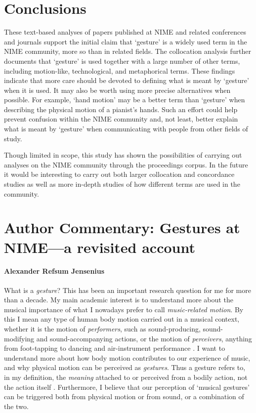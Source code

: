 \section{Conclusions}

These text-based analyses of papers published at NIME and related conferences and journals support the initial claim that `gesture' is a widely used term in the NIME community, more so than in related fields. The collocation analysis further documents that `gesture' is used together with a large number of other terms, including motion-like, technological, and metaphorical terms. 
These findings indicate that more care should be devoted to defining what is meant by `gesture' when it is used. It may also be worth using more precise alternatives when possible. For example, `hand motion' may be a better term than `gesture' when describing the physical motion of a pianist's hands. 
Such an effort could help prevent confusion within the NIME community and, not least, better explain what is meant by `gesture' when communicating with people from other fields of study. 

Though limited in scope, this study has shown the possibilities of carrying out analyses on the NIME community through the proceedings corpus. In the future it would be interesting to carry out both larger collocation and concordance studies as well as more in-depth studies of how different terms are used in the community.


\section*{Author Commentary: Gestures at NIME---a revisited account}


\paragraph{Alexander Refsum Jensenius}


What is a \emph{gesture}? This has been an important research question for me for more than a decade. My main academic interest is to understand more about the musical importance of what I nowadays prefer to call \emph{music-related motion}. By this I mean any type of human body motion carried out in a musical context, whether it is the motion of \emph{performers}, such as sound-producing, sound-modifying and sound-accompanying actions, or the motion of \emph{perceivers}, anything from foot-tapping to dancing and air-instrument performance \cite{Gritten:2006,Gritten:2011,Jensenius:2010}. I want to understand more about how body motion contributes to our experience of music, and why physical motion can be perceived as \emph{gestures}. Thus a gesture refers to, in my definition, the \emph{meaning} attached to or perceived from a bodily action, not the action itself \cite{McNeill:2005}. Furthermore, I believe that our perception of `musical gestures' can be triggered both from physical motion or from sound, or a combination of the two.

